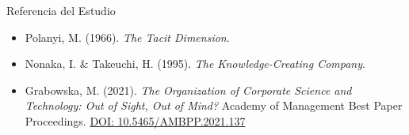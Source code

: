 \documentclass{beamer}
\begin{document}
	\begin{frame}{Referencia del Estudio}
		\begin{itemize}
			\item[\faBook] Polanyi, M. (1966). \textit{The Tacit Dimension}.
			\item[\faBookOpen] Nonaka, I. \& Takeuchi, H. (1995). \textit{The Knowledge-Creating Company}.
			\item[\faBookReader] Grabowska, M. (2021). \emph{The Organization of Corporate Science and Technology: Out of Sight, Out of Mind?} Academy of Management Best Paper Proceedings. \href{https://doi.org/10.5465/AMBPP.2021.137}{DOI: 10.5465/AMBPP.2021.137}
		\end{itemize}
	\end{frame}
	
\end{document}
